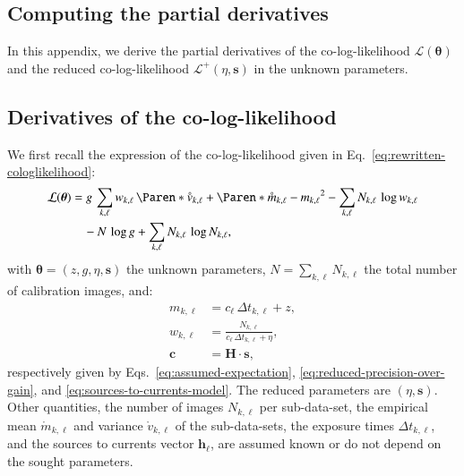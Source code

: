 \documentclass{aa}
\newcommand*{\empirical}[1]{\mathring{#1}}
\newcommand*{\V}[1]{\boldsymbol{#1}}   %
\newcommand*{\M}[1]{\mathbf{#1}}       %
\newcommand*{\TransposeLetter}{\top}
\newcommand*{\T}{^{\TransposeLetter}}
\newcommand*{\MC}[1]{\mathcal{#1}}
\newcommand*{\lkl}{\MC{L}}
\newcommand*{\lklplus}{\MC{L}^+}
\begin{document}
\begin{appendix}
\section{Computing the partial derivatives}
\label{sec:partial-derivatives}

In this appendix, we derive the partial derivatives of the co-log-likelihood
$\lkl(\V\theta)$ and the reduced co-log-likelihood $\lklplus(\eta, \V s)$
in the unknown parameters.

\subsection{Derivatives of the co-log-likelihood}
\label{sec:cologlikelihood-derivatives}

We first recall the expression of the co-log-likelihood given in
Eq.~\eqref{eq:rewritten-cologlikelihood}:
\begin{align}
  \lkl(\V\theta)
  &= g\,\sum_{k,\ell} w_{k,\ell}\,\Paren*{
      \empirical{v}_{k,\ell}
      + \Paren*{\empirical{m}_{k,\ell} - m_{k,\ell}}^2
  } - \sum_{k,\ell} N_{k,\ell}\,\log w_{k,\ell}\notag\\
  \label{eq:rewritten-cologlikelihood-appendix}
  &\quad - N\,\log g + \sum_{k,\ell} N_{k,\ell}\,\log N_{k,\ell},
\end{align}
with $\V\theta = (z, g, \eta, \V s)$ the unknown parameters, $N =
\sum_{k,\ell} N_{k,\ell}$ the total number of calibration images, and:
\begin{align}
  m_{k,\ell} &= c_{\ell}\,\Delta t_{k,\ell} + z,\\
  w_{k,\ell} &= \frac{N_{k,\ell}}{c_{\ell}\,\Delta t_{k,\ell} + \eta},\\
  \V c &= \M H⋅\V s,
\end{align}
respectively given by Eqs.~\eqref{eq:assumed-expectation},
\eqref{eq:reduced-precision-over-gain}, and
\eqref{eq:sources-to-currents-model}.  The reduced parameters are $(\eta, \V
s)$.  Other quantities, the number of images $N_{k,\ell}$ per sub-data-set, the
empirical mean $\empirical{m}_{k,\ell}$ and variance $\empirical{v}_{k,\ell}$
of the sub-data-sets, the exposure times $\Delta t_{k,\ell}$, and the sources
to currents vector $\V h_\ell$, are assumed known or do not depend on the
sought parameters.


\end{appendix}
\end{document}
